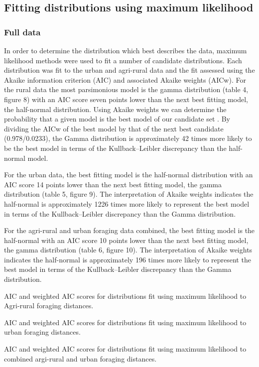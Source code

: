 \documentclass[11pt,usenames,dvipsnames,a4paper]{article}
\begin{document}
\subsection{Fitting distributions using maximum likelihood}

\subsubsection{Full data}

\begin{linenumbers}
\hspace{\parindent}
In order to determine the distribution which best describes the data, maximum likelihood methods were used to fit a number of candidate distributions. Each distribution was fit to the urban and agri-rural data and the fit assessed using the Akaike information criterion (AIC) and associated Akaike weights (AICw). For the rural data the most parsimonious model is the gamma distribution (table 4, figure 8) with an AIC score seven points lower than the next best fitting model, the half-normal distribution. Using Akaike weights we can determine the probability that a given model is the best model of our candidate set \citep{Burnham2004}. By dividing the AICw of the best model by that of the next best candidate (0.978/0.0233), the Gamma distribution is approximately 42 times more likely to be the best model in terms of the Kullback–Leibler discrepancy than the half-normal model.

For the urban data, the best fitting model is the half-normal distribution with an AIC score 14 points lower than the next best fitting model, the gamma distribution (table 5, figure 9). The interpretation of Akaike weights indicates the half-normal is approximately 1226 times more likely to represent the best model in terms of the Kullback–Leibler discrepancy than the Gamma distribution.

For the agri-rural and urban foraging data combined, the best fitting model is the half-normal with an AIC score 10 points lower than the next best fitting model, the gamma distribution (table 6, figure 10). The interpretation of Akaike weights indicates the half-normal is approximately 196 times more likely to represent the best model in terms of the Kullback–Leibler discrepancy than the Gamma distribution.
\end{linenumbers}

\begin{table}[H]
	\centering
	\caption{AIC and weighted AIC scores for distributions fit using maximum likelihood to Agri-rural foraging distances.}
	
\end{table}
\begin{table}[H]
	\centering
	\caption{AIC and weighted AIC scores for distributions fit using maximum likelihood to urban foraging distances.}
	
\end{table}
\begin{table}[H]
	\centering
	\caption{AIC and weighted AIC scores for distributions fit using maximum likelihood to combined argi-rural and urban foraging distances.}
	
\end{table}
\end{document}
